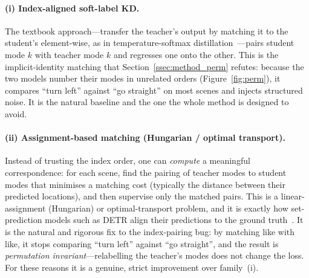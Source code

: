 \paragraph{(i) Index-aligned soft-label KD.} The textbook approach---transfer the
teacher's output by matching it to the student's element-wise, as in
temperature-softmax distillation~\cite{hinton}---pairs student mode
$k$ with teacher mode $k$ and regresses one onto the other. This is the
implicit-identity matching that Section~\ref{ssec:method_perm} refutes: because the
two models number their modes in unrelated orders (Figure~\ref{fig:perm}), it
compares ``turn left'' against ``go straight'' on most scenes and injects
structured noise. It is the natural baseline and the one the whole method is
designed to avoid.

\paragraph{(ii) Assignment-based matching (Hungarian / optimal transport).}
Instead of trusting the index order, one can \emph{compute} a meaningful
correspondence: for each scene, find the pairing of teacher modes to student modes
that minimises a matching cost (typically the distance between their predicted
locations), and then supervise only the matched pairs. This is a linear-assignment
(Hungarian) or optimal-transport problem, and it is exactly how set-prediction
models such as DETR align their predictions to the ground truth~\cite{carion2020detr}.
It is the natural and rigorous fix to the index-pairing bug: by matching like with
like, it stops comparing ``turn left'' against ``go straight'', and the result is
\emph{permutation invariant}---relabelling the teacher's modes does not change the
loss. For these reasons it is a genuine, strict improvement over family~(i).

